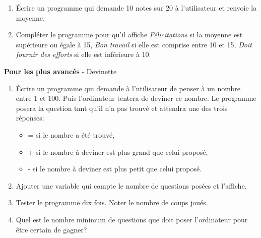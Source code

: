 \documentclass[a4paper,11pt]{article}
\begin{document}
\begin{exo}
\begin{enumerate}
\item Écrire un programme qui demande 10 notes sur 20 à l'utilisateur et renvoie la moyenne.
\item Compléter le programme pour qu'il affiche \emph{Félicitations} si la moyenne est supérieure ou égale à 15, \emph{Bon travail} si elle est comprise entre 10 et 15, \emph{Doit fournir des efforts} si elle est inférieure à 10.
\end{enumerate}
\end{exo}
\begin{exo}
\textbf{Pour les plus avancés} - Devinette
\begin{enumerate}
\item Écrire un programme qui demande à l'utilisateur de penser à un nombre entre 1 et 100. Puis l'ordinateur tentera de deviner ce nombre. Le programme posera la question  tant qu'il n'a pas trouvé et attendra une des trois réponses:
\begin{itemize}
\item = si le nombre a été trouvé,
\item + si le nombre à deviner est plus grand que celui proposé,
\item - si le nombre à deviner est plus petit que celui proposé.
\end{itemize}
\item Ajouter une variable qui compte le nombre de questions posées et l'affiche.
\item Tester le programme dix fois. Noter le nombre de coups joués.
\item Quel est le nombre minimum de questions que doit poser l'ordinateur pour être certain de gagner? 
\end{enumerate}
\end{exo}
\end{document}

